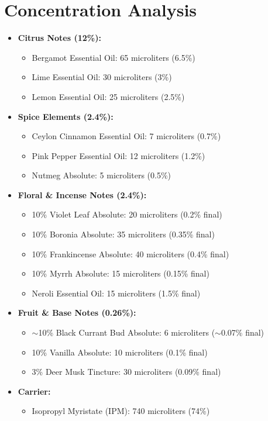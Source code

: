 \documentclass{article}
\begin{document}
\section*{Concentration Analysis}
\begin{itemize}[leftmargin=*]
  \item \textcolor{colaRed}{\textbf{Citrus Notes (12\%):}}
  \begin{itemize}
    \item Bergamot Essential Oil: 65 microliters (6.5\%)
    \item Lime Essential Oil: 30 microliters (3\%)
    \item Lemon Essential Oil: 25 microliters (2.5\%)
  \end{itemize}
  
  \item \textcolor{colaRed}{\textbf{Spice Elements (2.4\%):}}
  \begin{itemize}
    \item Ceylon Cinnamon Essential Oil: 7 microliters (0.7\%)
    \item Pink Pepper Essential Oil: 12 microliters (1.2\%)
    \item Nutmeg Absolute: 5 microliters (0.5\%)
  \end{itemize}
  
  \item \textcolor{violetPurple}{\textbf{Floral \& Incense Notes (2.4\%):}}
  \begin{itemize}
    \item 10\% Violet Leaf Absolute: 20 microliters (0.2\% final)
    \item 10\% Boronia Absolute: 35 microliters (0.35\% final)
    \item 10\% Frankincense Absolute: 40 microliters (0.4\% final)
    \item 10\% Myrrh Absolute: 15 microliters (0.15\% final)
    \item Neroli Essential Oil: 15 microliters (1.5\% final)
  \end{itemize}
  
  \item \textcolor{colaBrown}{\textbf{Fruit \& Base Notes (0.26\%):}}
  \begin{itemize}
    \item $\sim$10\% Black Currant Bud Absolute: 6 microliters ($\sim$0.07\% final)
    \item 10\% Vanilla Absolute: 10 microliters (0.1\% final)
    \item 3\% Deer Musk Tincture: 30 microliters (0.09\% final)
  \end{itemize}
  
  \item \textcolor{colaBrown}{\textbf{Carrier:}}
  \begin{itemize}
    \item Isopropyl Myristate (IPM): 740 microliters (74\%)
  \end{itemize}
\end{itemize}
\end{document}
